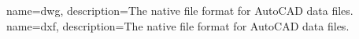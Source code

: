 {
        name=dwg,
        description={The native file format for AutoCAD data files.}
}
{
        name=dxf,
        description={The native file format for AutoCAD data files.}
}